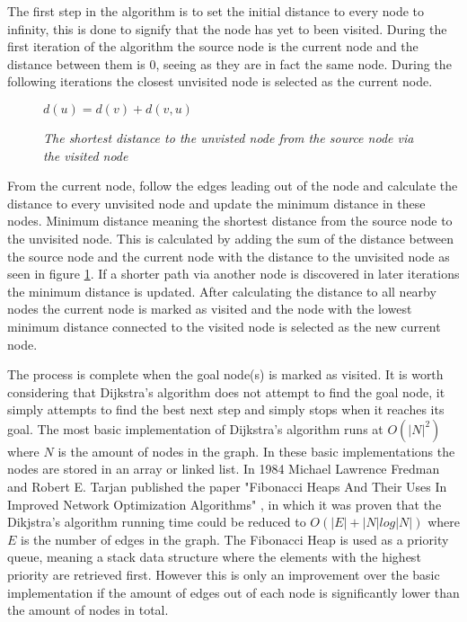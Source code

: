 The first step in the algorithm is to set the initial distance to every node to infinity, this is done to signify that the node has yet to been visited. During the first iteration of the algorithm the
source node is the current node and the distance between them is 0, seeing as they are in fact the same node. During the following iterations the closest unvisited node is selected as the
current node.

\begin{figure}[h]
\centering
\begin{math}
d(u) = d(v) + d(v,u)
\end{math}
\caption{\textit{The shortest distance to the unvisted node from the source node via the visited node}}
\label{fig:relax}
\end{figure}

From the current node, follow the edges leading out of the node and calculate the distance to every unvisited node and update the minimum distance in these nodes. Minimum distance meaning the shortest distance from the source node to the unvisited node. This is calculated by adding the sum of the distance between the source node and the current node with the distance to the unvisited node as seen in figure \ref{fig:relax}. If a shorter path via another node is discovered in later iterations the minimum distance is updated. After calculating the distance to all nearby nodes the current node is marked as visited and the node with the lowest minimum distance connected to the visited node is selected as the new current node. 

The process is complete when the goal node(s) is marked as visited. It is worth considering that Dijkstra's algorithm does not attempt to find the goal node, it simply attempts to find the best next step and simply stops when it reaches its goal. The most basic implementation of Dijkstra's algorithm runs at $O(|N|^2)$ where $N$ is the amount of nodes in the graph. In these basic implementations the nodes are stored in an array or linked list. In 1984 Michael Lawrence Fredman and Robert E. Tarjan published the paper "Fibonacci Heaps And Their Uses In Improved Network Optimization Algorithms" \cite{715934}, in which it was proven that the Dikjstra's algorithm running time could be reduced to $O(|E| + |N|log|N|)$ where $E$ is the number of edges in the graph. The Fibonacci Heap is used as a priority queue, meaning a stack data structure where the elements with the highest priority are retrieved first. However this is only an improvement over the basic implementation if the amount of edges out of each node is significantly lower than the amount of nodes in total.










